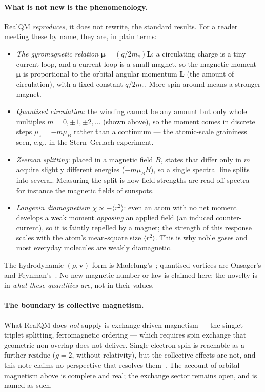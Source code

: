 \documentclass[11pt]{article}
\begin{document}
\paragraph{What is not new is the phenomenology.} RealQM \emph{reproduces}, it does not rewrite, the standard
results. For a reader meeting these by name, they are, in plain terms:
\begin{itemize}
\item \emph{The gyromagnetic relation} $\boldsymbol\mu=(q/2m_e)\mathbf L$: a circulating charge is a tiny
current loop, and a current loop is a small magnet, so the magnetic moment $\boldsymbol\mu$ is proportional to
the orbital angular momentum $\mathbf L$ (the amount of circulation), with a fixed constant $q/2m_e$. More
spin-around means a stronger magnet.
\item \emph{Quantised circulation}: the winding cannot be any amount but only whole multiples $m=0,\pm1,\pm2,\dots$
(shown above), so the moment comes in discrete steps $\mu_z=-m\mu_B$ rather than a continuum --- the atomic-scale
graininess seen, e.g., in the Stern--Gerlach experiment.
\item \emph{Zeeman splitting}: placed in a magnetic field $B$, states that differ only in $m$ acquire slightly
different energies ($-m\mu_B B$), so a single spectral line splits into several. Measuring the split is how field
strengths are read off spectra --- for instance the magnetic fields of sunspots.
\item \emph{Langevin diamagnetism} $\chi\propto-\langle r^2\rangle$: even an atom with no net moment develops a
weak moment \emph{opposing} an applied field (an induced counter-current), so it is faintly repelled by a magnet;
the strength of this response scales with the atom's mean-square size $\langle r^2\rangle$. This is why noble
gases and most everyday molecules are weakly diamagnetic.
\end{itemize}
The hydrodynamic $(\rho,\mathbf v)$ form is Madelung's~\cite{Madelung}; quantised vortices are Onsager's and
Feynman's~\cite{Onsager,Feynman}. No new magnetic number or law is claimed here; the novelty is in \emph{what
these quantities are}, not in their values.

\paragraph{The boundary is collective magnetism.} What RealQM does \emph{not} supply is exchange-driven
magnetism --- the singlet--triplet splitting, ferromagnetic ordering --- which requires spin exchange that
geometric non-overlap does not deliver. Single-electron spin is reachable as a further residue ($g=2$, without
relativity), but the collective effects are not, and this note claims no perspective that resolves
them~\cite{Magnetism}. The account of orbital magnetism above is complete and real; the exchange sector remains
open, and is named as such.
\end{document}

